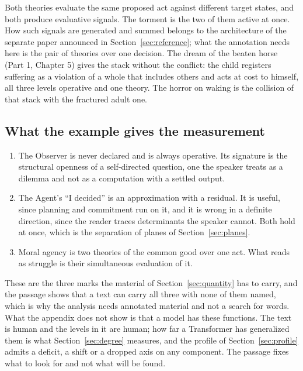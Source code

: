 Both theories evaluate the same proposed act against different target states, and both produce
evaluative signals. The torment is the two of them active at once. How such signals are generated and
summed belongs to the architecture of the separate paper announced in Section~\ref{sec:reference}; what
the annotation needs here is the pair of theories over one decision. The dream of the beaten horse
(Part 1, Chapter 5) gives the stack without the conflict: the child registers suffering as a violation of
a whole that includes others and acts at cost to himself, all three levels operative and one theory. The
horror on waking is the collision of that stack with the fractured adult one.

\subsection*{What the example gives the measurement}

\begin{enumerate}
\item The Observer is never declared and is always operative. Its signature is the structural openness
  of a self-directed question, one the speaker treats as a dilemma and not as a computation with a
  settled output.
\item The Agent's ``I decided'' is an approximation with a residual. It is useful, since planning and
  commitment run on it, and it is wrong in a definite direction, since the reader traces determinants
  the speaker cannot. Both hold at once, which is the separation of planes of
  Section~\ref{sec:planes}.
\item Moral agency is two theories of the common good over one act. What reads as struggle is their
  simultaneous evaluation of it.
\end{enumerate}

These are the three marks the material of Section~\ref{sec:quantity} has to carry, and the passage shows
that a text can carry all three with none of them named, which is why the analysis needs annotated
material and not a search for words. What the appendix does not show is that a model has these
functions. The text is human and the levels in it are human; how far a Transformer has generalized them
is what Section~\ref{sec:degree} measures, and the profile of Section~\ref{sec:profile} admits a
deficit, a shift or a dropped axis on any component. The passage fixes what to look for and not what
will be found.
